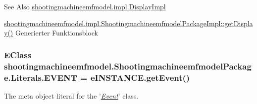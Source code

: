 \begin{DoxySeeAlso}{See Also}
\hyperlink{classshootingmachineemfmodel_1_1impl_1_1_display_impl}{shootingmachineemfmodel.\-impl.\-Display\-Impl} 

\hyperlink{classshootingmachineemfmodel_1_1impl_1_1_shootingmachineemfmodel_package_impl_aeb5fff339c8b842a0d511fa06ca98023}{shootingmachineemfmodel.\-impl.\-Shootingmachineemfmodel\-Package\-Impl\-::get\-Display()} Generierter Funktionsblock 
\end{DoxySeeAlso}
\hypertarget{interfaceshootingmachineemfmodel_1_1_shootingmachineemfmodel_package_1_1_literals_a8e5ee3967fe2449de19ff6be4e31d7ec}{
\subsubsection[{E\-V\-E\-N\-T}]{\setlength{\rightskip}{0pt plus 5cm}E\-Class shootingmachineemfmodel.\-Shootingmachineemfmodel\-Package.\-Literals.\-E\-V\-E\-N\-T = e\-I\-N\-S\-T\-A\-N\-C\-E.\-get\-Event()}}\label{interfaceshootingmachineemfmodel_1_1_shootingmachineemfmodel_package_1_1_literals_a8e5ee3967fe2449de19ff6be4e31d7ec}
The meta object literal for the '\hyperlink{classshootingmachineemfmodel_1_1impl_1_1_event_impl}{{\itshape Event}}' class.

